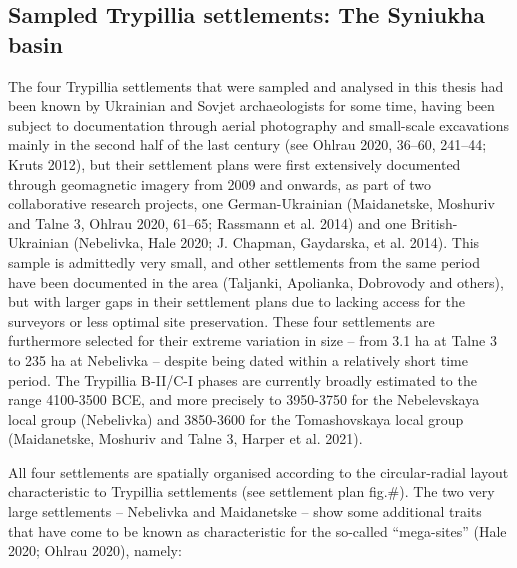 \documentclass[
  12pt,
  a4paper, twoside]{book}
\begin{document}
\hypertarget{sampled-trypillia-settlements-the-syniukha-basin}{%
\subsection{Sampled Trypillia settlements: The Syniukha basin}\label{sampled-trypillia-settlements-the-syniukha-basin}}

The four Trypillia settlements that were sampled and analysed in this thesis had been known by Ukrainian and Sovjet archaeologists for some time, having been subject to documentation through aerial photography and small-scale excavations mainly in the second half of the last century (see Ohlrau 2020, 36--60, 241--44; Kruts 2012), but their settlement plans were first extensively documented through geomagnetic imagery from 2009 and onwards, as part of two collaborative research projects, one German-Ukrainian (Maidanetske, Moshuriv and Talne 3, Ohlrau 2020, 61--65; Rassmann et al. 2014) and one British-Ukrainian (Nebelivka, Hale 2020; J. Chapman, Gaydarska, et al. 2014). This sample is admittedly very small, and other settlements from the same period have been documented in the area (Taljanki, Apolianka, Dobrovody and others), but with larger gaps in their settlement plans due to lacking access for the surveyors or less optimal site preservation. These four settlements are furthermore selected for their extreme variation in size -- from 3.1 ha at Talne 3 to 235 ha at Nebelivka -- despite being dated within a relatively short time period. The Trypillia B-II/C-I phases are currently broadly estimated to the range 4100-3500 BCE, and more precisely to 3950-3750 for the Nebelevskaya local group (Nebelivka) and 3850-3600 for the Tomashovskaya local group (Maidanetske, Moshuriv and Talne 3, Harper et al. 2021).

All four settlements are spatially organised according to the circular-radial layout characteristic to Trypillia settlements (see settlement plan fig.\#). The two very large settlements -- Nebelivka and Maidanetske -- show some additional traits that have come to be known as characteristic for the so-called ``mega-sites'' (Hale 2020; Ohlrau 2020), namely:
\end{document}
